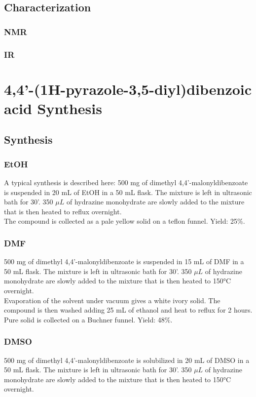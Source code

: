 \documentclass[../Master.tex]{subfiles}
\begin{document}
\subsection{Characterization}
\subsubsection{NMR}
\subsubsection{IR}
\section{4,4'-(1H-pyrazole-3,5-diyl)dibenzoic acid Synthesis}
\subsection{Synthesis}
\subsubsection{EtOH}
A typical synthesis is described here:
500 mg of dimethyl 4,4'-malonyldibenzoate is suspended in 20 mL of EtOH in a 50 mL flask. The mixture is left in ultrasonic bath for 30'. 350 \(\mu L\) of hydrazine monohydrate are slowly added to the mixture that is then heated to reflux overnight.\\
The compound is collected as a pale yellow solid on a teflon funnel. Yield: 25\%.
\subsubsection{DMF}
500 mg of dimethyl 4,4'-malonyldibenzoate is suspended in 15 mL of DMF in a 50 mL flask. The mixture is left in ultrasonic bath for 30'. 350 \(\mu L\) of hydrazine monohydrate are slowly added to the mixture that is then heated to 150°C overnight.\\
Evaporation of the solvent under vacuum gives a white ivory solid. The compound is then washed adding 25 mL of ethanol and heat to reflux for 2 hours. Pure solid is collected on a Buchner funnel. Yield: 48\%.
\subsubsection{DMSO}
500 mg of dimethyl 4,4'-malonyldibenzoate is solubilized in 20 mL of DMSO in a 50 mL flask. The mixture is left in ultrasonic bath for 30'. 350 \(\mu L\) of hydrazine monohydrate are slowly added to the mixture that is then heated to 150°C overnight.\\
\end{document}
